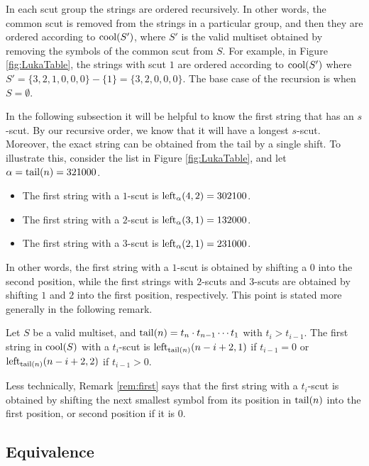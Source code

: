 In each scut group the strings are ordered recursively.
In other words, the common scut is removed from the strings in a particular group, and then they are ordered according to $\cool{S'}$, where $S'$ is the valid multiset obtained by removing the symbols of the common scut from $S$.
For example, in Figure \ref{fig:LukaTable}, the strings with scut $1$ are ordered according to $\cool{S'}$ where $S' = \{3,2,1,0,0,0\} - \{1\} = \{3,2,0,0,0\}$.
The base case of the recursion is when $S = \emptyset$.

In the following subsection it will be helpful to know the first string that has an $s$-scut.
By our recursive order, we know that it will have a longest $s$-scut.
Moreover, the exact string can be obtained from the tail by a single shift.
To illustrate this, consider the list in Figure \ref{fig:LukaTable}, and let $\alpha = \tail(n) = 321000$.
\begin{itemize}
    \item The first string with a $1$-scut is $\lshiftindex[\alpha]{4}{2} = 302100$.
    \item The first string with a $2$-scut is $\lshiftindex[\alpha]{3}{1} = 132000$.
    \item The first string with a $3$-scut is $\lshiftindex[\alpha]{2}{1} = 231000$.
\end{itemize}
In other words, the first string with a $1$-scut is obtained by shifting a $0$ into the second position, while the first strings with $2$-scuts and $3$-scuts are obtained by shifting $1$ and $2$ into the first position, respectively.
This point is stated more generally in the following remark.

\begin{remark}
\label{rem:first}
Let $S$ be a valid multiset, and $\tail(n) = t_n \cdot t_{n-1} \cdots t_1$ with $t_i > t_{i-1}$.
The first string in $\cool{S}$ with a $t_i$-scut is $\lshiftindex[\tail(n)]{n-i+2}{1}$ if $t_{i-1} = 0$ or $\lshiftindex[\tail(n)]{n-i+2}{2}$ if $t_{i-1} > 0$.
\end{remark}

Less technically, Remark \ref{rem:first} says that the first string with a $t_i$-scut is obtained by shifting the next smallest symbol from its position in $\tail(n)$ into the first position, or second position if it is $0$.



\subsection{Equivalence}
\label{sec:proof_equal}

